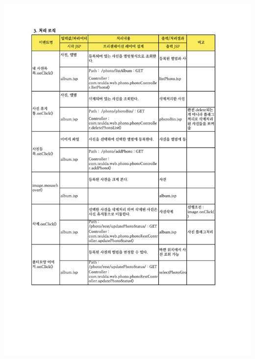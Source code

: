 {{{{{{{{{{{{{{{{{{{{{{{{{{{{{{{{{{{{{{{{{{{{{{{{\includegraphics[width=20cm]{./Figure/Design/Display/photo/photo_04.pdf} \\
}}}}}}}}}}}}}}}}}}}}}}}}}}}}}}}}}}}}}}}}}}}}}}}}
